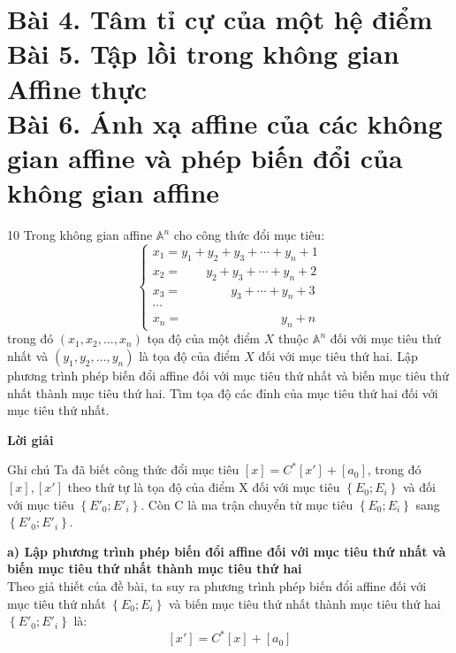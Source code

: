\documentclass[12pt,a4paper]{article}
\newcommand{\Cau}[2]{
    \vspace{0.8cm} %
    \begin{BaiToanBox}{#1}
        #2
    \end{BaiToanBox}
}
\begin{document}
\section{Bài 4. Tâm tỉ cự của một hệ điểm \\[4pt] Bài 5. Tập lồi trong không gian Affine thực \\[4pt] Bài 6. Ánh xạ affine của các không gian affine và phép biến đổi của không gian affine}
\Cau{10}{ Trong không gian affine \(\mathbb{A}^n\) cho công thức đổi mục tiêu: 
\[
\begin{cases}
x_1 = y_1 + y_2 + y_3 + \cdots + y_n + 1 \\
x_2 = \qquad y_2 + y_3 + \cdots + y_n + 2 \\
x_3 = \qquad\qquad y_3 + \cdots + y_n + 3 \\
\cdots \\
x_n = \qquad\qquad\qquad\qquad y_n + n
\end{cases}
\]
trong đó \((x_1,x_2,...,x_n)\) tọa độ của một điểm \(X\) thuộc \(\mathbb{A}^n\) đối với mục tiêu thứ nhất và \((y_1,y_2,...,y_n)\) là tọa độ của điểm \(X\) đối với mục tiêu thứ hai. Lập phương trình phép biến đổi affine đối với mục tiêu thứ nhất và biến mục tiêu thứ nhất thành mục tiêu thứ hai. Tìm tọa độ các đỉnh của mục tiêu thứ hai đối với mục tiêu thứ nhất. }
\begin{center}
{\large\bfseries\textcolor{mainpurple}{Lời giải}}
\end{center}
\begin{DinhNghiaBox}{Ghi chú}
Ta đã biết công thức đổi mục tiêu \( [x]=C^*[x']+[a_0] \), trong đó \([x], [x'] \) theo thứ tự là tọa độ của điểm X đối với mục tiêu \( \left \{ E_0; E_i \right \} \) và đối với mục tiêu \( \left \{ E'_0; E'_i \right \} \). Còn C là ma trận chuyển từ mục tiêu \( \left \{ E_0; E_i \right \} \) sang \( \left \{ E'_0; E'_i \right \} \).
\end{DinhNghiaBox}
\textbf{a) Lập phương trình phép biến đổi affine đối với mục tiêu thứ nhất và biến mục tiêu thứ nhất thành mục tiêu thứ hai} \\[4pt]
Theo giả thiết của đề bài, ta suy ra phương trình phép biến đổi affine đối với mục tiêu thứ nhất \( \left \{ E_0; E_i \right \} \) và biến mục tiêu thứ nhất thành mục tiêu thứ hai \( \left \{ E'_0; E'_i \right \} \) là: \[
[x']=C^*[x]+[a_0]
\]
\begin{center}
\end{center}
\end{document}
